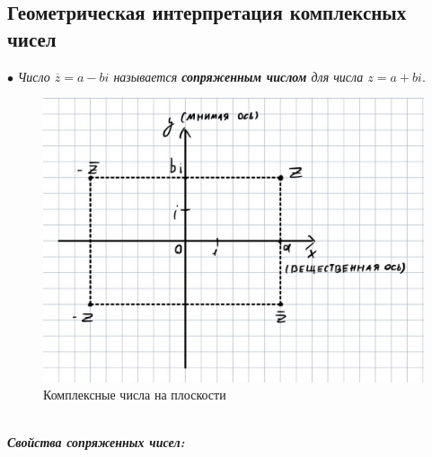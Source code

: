 \documentclass[a4paper, 12pt]{article}
\begin{document}
\subsection{Геометрическая интерпретация комплексных чисел}
$\bullet$ \textit{Число $\overline{z}=a-bi$ называется \textbf{сопряженным числом} для числа $z=a+bi$}.\\
\begin{figure}[ht]
\centering
\includegraphics[width=0.5\linewidth]{pict1.jpg}
\caption{Комплексные числа на плоскости}
\label{fig:reg}
\end{figure}\\
\textit{\textbf{Свойства сопряженных чисел:}}
\end{document}
